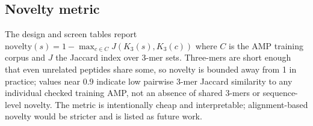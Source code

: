 \subsection{Novelty metric}
The design and screen tables report
$\mathrm{novelty}(s) = 1 - \max_{c \in C} J(K_3(s), K_3(c))$ where $C$ is the
AMP training corpus and $J$ the Jaccard index over 3-mer sets. Three-mers are
short enough that even unrelated peptides share some, so novelty is bounded
away from 1 in practice; values near 0.9 indicate low pairwise 3-mer Jaccard similarity to any
individual checked training AMP, not an absence of shared 3-mers or
sequence-level novelty. The metric is intentionally
cheap and interpretable; alignment-based novelty would be stricter and is
listed as future work.
